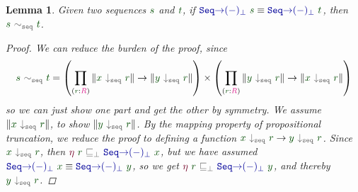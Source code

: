 \documentclass[twoside,11pt,openright]{report}
\theoremstyle{plain} %
\newtheorem{lem}[thm]{Lemma}
\theoremstyle{definition}
\theoremstyle{remark}
\newcommand*{\term}[1]{\textcolor{green!30!black}{#1}} %
\newcommand*{\type}[1]{\textcolor{magenta!90!black}{#1}}
\newcommand*{\relation}[1]{\textcolor{gray!75!black}{\ensuremath{\mathtt{#1}}}}
\newcommand*{\function}[1]{\textcolor{blue!60!black}{\ensuremath{\mathtt{#1}}}}
\newcommand*{\constructor}[1]{\textcolor{purple!60!black}{\ensuremath{\mathtt{#1}}}}
\begin{document}
\begin{lem}
  \label{eq:injectivity-lemma}
  Given two sequences \(\term{s}\) and \(\term{t}\), if \(\function{Seq{\rightarrow}(-)_\bot}~\term{s} \equiv \function{Seq{\rightarrow}(-)_\bot}~\term{t}\), then \(\term{s}~\relation{\sim_{seq}}~\term{t}\).
  \begin{proof}
    We can reduce the burden of the proof, since
    \begin{equation}
      \term{s}~\relation{\sim_{seq}}~\term{t} = \left(\prod_{(\term{r} : \type{R})} \| \term{x}~\relation{\downarrow_{seq}}~\term{r} \| \rightarrow \| \term{y}~\relation{\downarrow_{seq}}~\term{r} \|\right) \times \left(\prod_{(\term{r} : \type{R})} \| \term{y}~\relation{\downarrow_{seq}}~\term{r} \| \rightarrow \| \term{x}~\relation{\downarrow_{seq}}~\term{r} \|\right)
    \end{equation}
    so we can just show one part and get the other by symmetry. We assume \(\| \term{x}~\relation{\downarrow_{seq}}~\term{r} \|\), to show \(\| \term{y}~\relation{\downarrow_{seq}}~\term{r} \|\). By the mapping property of propositional truncation, we reduce the proof to defining a function \(\term{x}~\relation{\downarrow_{seq}}~\term{r} \rightarrow \term{y}~\relation{\downarrow_{seq}}~\term{r}\). Since \(\term{x}~\relation{\downarrow_{seq}}~\term{r}\), then \(\constructor{\eta}~\term{r}~\relation{\sqsubseteq_{\bot}}~\function{Seq{\rightarrow}(-)_\bot}~\term{x}\), but we have assumed \(\function{Seq{\rightarrow}(-)_\bot}~\term{x} \equiv \function{Seq{\rightarrow}(-)_\bot}~\term{y}\), so we get \(\constructor{\eta}~\term{r}~\relation{\sqsubseteq_{\bot}}~\function{Seq{\rightarrow}(-)_\bot}~\term{y}\), and thereby \(\term{y}~\relation{\downarrow_{seq}}~\term{r}\).
  \end{proof}
\end{lem}
\end{document}
